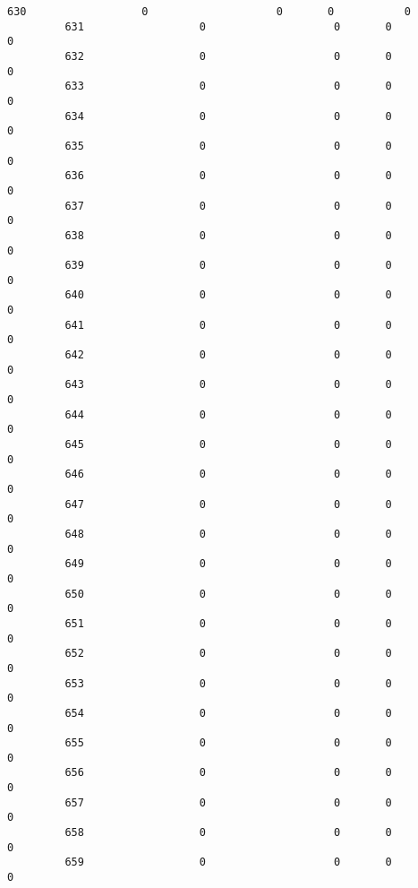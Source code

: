 \documentclass[11pt]{article}
\begin{document}
\begin{Verbatim}[commandchars=\\\{\}]
         630                  0                    0       0           0   
         631                  0                    0       0           0   
         632                  0                    0       0           0   
         633                  0                    0       0           0   
         634                  0                    0       0           0   
         635                  0                    0       0           0   
         636                  0                    0       0           0   
         637                  0                    0       0           0   
         638                  0                    0       0           0   
         639                  0                    0       0           0   
         640                  0                    0       0           0   
         641                  0                    0       0           0   
         642                  0                    0       0           0   
         643                  0                    0       0           0   
         644                  0                    0       0           0   
         645                  0                    0       0           0   
         646                  0                    0       0           0   
         647                  0                    0       0           0   
         648                  0                    0       0           0   
         649                  0                    0       0           0   
         650                  0                    0       0           0   
         651                  0                    0       0           0   
         652                  0                    0       0           0   
         653                  0                    0       0           0   
         654                  0                    0       0           0   
         655                  0                    0       0           0   
         656                  0                    0       0           0   
         657                  0                    0       0           0   
         658                  0                    0       0           0   
         659                  0                    0       0           0   
         

\end{Verbatim}
\end{document}
